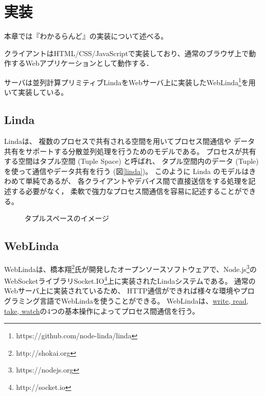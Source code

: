 \section{実装}
本章では『わかるらんど』の実装について述べる。

クライアントはHTML/CSS/JavaScriptで実装しており、通常のブラウザ上で動作するWebアプリケーションとして動作する．

サーバは並列計算プリミティブLindaをWebサーバ上に実装したWebLinda\footnote{https://github.com/node-linda/linda}を用いて実装している。

\subsection{Linda}
Linda\cite{Carriero:1989:LC:63334.63337}は、
複数のプロセスで共有される空間を用いてプロセス間通信や
データ共有をサポートする分散並列処理を行うためのモデルである。
プロセスが共有する空間はタプル空間 (Tuple Space) と呼ばれ、
タプル空間内のデータ (Tuple) を使って通信やデータ共有を行う (図\ref{linda})。
このように Linda のモデルはきわめて単純であるが、
各クライアントやデバイス間で直接送信をする処理を記述する必要がなく，
柔軟で強力なプロセス間通信を容易に記述することができる。

\begin{figure}[h]
\centering
{}
\caption{タプルスペースのイメージ}
\label{button}
\end{figure}

\subsection{WebLinda}
WebLindaは、橋本翔\footnote{http://shokai.org}氏が開発したオープンソースソフトウェアで、Node.js\footnote{https://nodejs.org}のWebSocketライブラリSocket.IO\footnote{http://socket.io}上に実装されたLindaシステムである。
通常のWebサーバ上に実装されているため、
HTTP通信ができれば様々な環境やプログラミング言語でWebLindaを使うことができる。
WebLindaは、\url{write, read, take, watch}の4つの基本操作によってプロセス間通信を行う。


